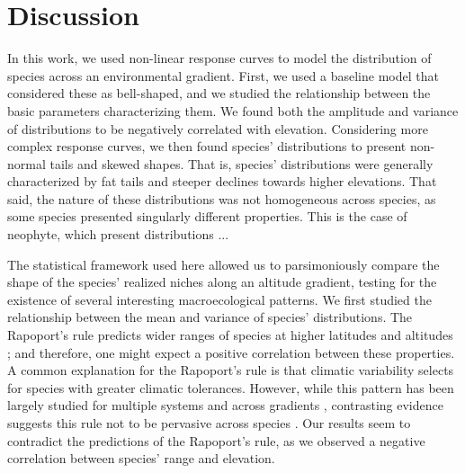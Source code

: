 \documentclass[11pt, a4paper]{article}
\begin{document}


\section*{Discussion}
In this work, we used non-linear response curves to model the distribution of species across an environmental gradient. First, we used a baseline model that considered these as bell-shaped, and we studied the relationship between the basic parameters characterizing them. We found both the amplitude and variance of distributions to be negatively correlated with elevation. Considering more complex response curves, we then found species' distributions to present non-normal tails and skewed shapes. That is, species' distributions were generally characterized by fat tails and steeper declines towards higher elevations. That said, the nature of these distributions was not homogeneous across species, as some species presented singularly different properties. This is the case of neophyte, which present distributions ... %

The statistical framework used here allowed us to parsimoniously compare the shape of the species' realized niches along an altitude gradient, testing for the existence of several interesting macroecological patterns. We first studied the relationship between the mean and variance of species' distributions. The Rapoport's rule predicts wider ranges of species at higher latitudes and altitudes \citep{stevensElevationalGradientAltitudinal1992}; and therefore, one might expect a positive correlation between these properties. A common explanation for the Rapoport's rule is that climatic variability selects for species with greater climatic tolerances. However, while this pattern has been largely studied for multiple systems and across gradients \citep{mccainElevationalRapoportRule2013}, contrasting evidence suggests this rule not to be pervasive across species \citep{ribasRapoportEffectWidespread2006, bhattaraiCanRapoportRule2006, mccainElevationalRapoportRule2013}. Our results seem to contradict the predictions of the Rapoport's rule, as we observed a negative correlation between species' range and elevation. 
\end{document}
